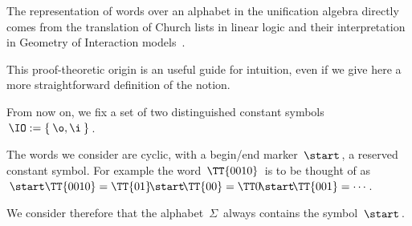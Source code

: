 The representation of words over an alphabet in the unification algebra directly comes from the translation of Church lists in linear logic and their interpretation in Geometry of Interaction models~\cite{girard_geometry_1989,girard_geometry_1995}.

This proof-theoretic origin is an useful guide for intuition, even if we give here a more straightforward definition of the notion.

\medskip
From now on, we fix a set of two distinguished constant symbols $\,\IO:=\{\:\o,\i\:\}\,$.


The words we consider are cyclic, with a begin/end marker $\,\start\,$, a reserved constant symbol.
For example the word $\,\TT{0010}\,$ is to be thought of as $\,\start\TT{0010}=\TT{01}\!\start\!\TT{00}=\TT0\!\start\!\TT{001}=\cdots\,$.

We consider therefore that the alphabet $\,\Sigma\,$ always contains the symbol $\,\start\,$.

